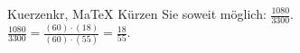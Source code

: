 \begin{MAufgabe}{Kuerzen}{kr, MaTeX}
K\"urzen Sie soweit m\"oglich: $\frac{1080}{3300}$.\\ 
\ifLsg\MLoesung
\quad $\frac{1080}{3300}=\frac{(60)\cdot(18)}{(60)\cdot(55)}=\frac{18}{55}$.\else\relax\fi
 \end{MAufgabe}